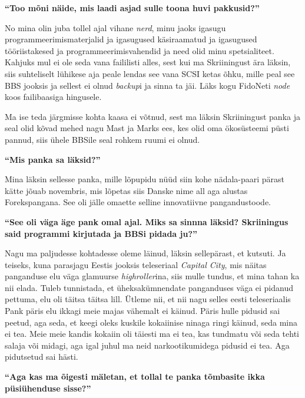 \textbf{\enquote{Too mõni näide, mis laadi asjad sulle toona huvi pakkusid?}}

No mina olin juba tollel ajal vihane \emph{nerd}, minu jaoks igasugu programmeerimismaterjalid ja igasugused käsiraamatud ja igasugused tööriistakesed ja  programmeerimisvahendid ja need olid minu spetsialiteet. Kahjuks mul ei ole seda vana faililisti alles, sest kui ma Skriiningust ära läksin, siis suhteliselt lühikese aja peale lendas see vana SCSI ketas õhku, mille peal see BBS jooksis ja sellest ei olnud \emph{backup}i ja sinna ta jäi. Läks kogu FidoNeti \emph{node} koos failibaasiga hingusele.

Ma ise teda järgmisse kohta kaasa ei võtnud, sest ma läksin Skriiningust panka ja seal olid kõvad mehed nagu Mast ja  Marks  ees, kes olid oma ökosüsteemi püsti pannud, siis ühele BBSile seal rohkem ruumi ei olnud. 

\textbf{\enquote{Mis panka sa läksid?}}

Mina läksin sellesse panka, mille lõpupidu nüüd siin kohe nädala-paari pärast kätte jõuab novembris, mis lõpetas siis Danske nime all aga alustas Forekspangana. See oli jälle omaette selline innovatiivne pangandustoode. 

\textbf{\enquote{See oli väga äge pank omal ajal. Miks sa sinnna läksid? Skriiningus said programmi kirjutada ja BBSi pidada ju?}}

Nagu ma paljudesse kohtadesse oleme läinud, läksin sellepärast, et kutsuti. Ja teiseks, kuna parasjagu Eestis jooksis teleseriaal \emph{Capital City}, mis näitas panganduse elu väga glamuurse \emph{highroller}ina, siis mulle tundus, et mina tahan ka nii elada. Tuleb tunnistada, et üheksakümnendate panganduses  väga ei pidanud pettuma, elu oli täitsa täitsa lill. Ütleme nii, et nii nagu selles eesti teleseriaalis Pank päris elu ikkagi meie majas vähemalt ei käinud. Päris hulle pidusid sai peetud, aga seda, et keegi oleks kuskile kokaiinise  ninaga ringi käinud, seda mina ei tea. Meie meie kandis  kokaiin oli täiesti ma ei tea, kas tundmatu või seda tehti salaja või midagi, aga igal juhul ma neid narkootikumidega pidusid ei tea. Aga pidutsetud sai hästi.

\textbf{\enquote{Aga kas ma õigesti mäletan, et tollal te panka tõmbasite ikka püsiühenduse sisse?}}

